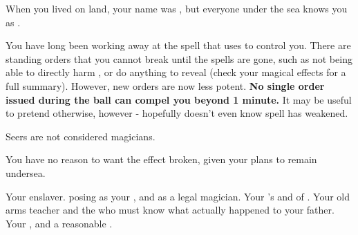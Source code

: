 \documentclass[char]{NeptuneBall}
\begin{document}
\begin{itemz}[Note]
  \item When you lived on land, your name was \cSlave{}, but everyone under the sea knows you as \cSlave{\full}.
	\item You have long been working away at the spell that \cWitch{} uses to control you. There are standing orders that you cannot break until the spells are gone, such as not being able to directly harm \cWitch{\them}, or do anything to reveal \cWitch{\them} (check your magical effects for a full summary). However, new orders are now less potent. {\bf No single order issued during the ball can compel you beyond 1 minute.} It may be useful to pretend otherwise, however - \cWitch{} hopefully doesn't even know \cWitch{\their} spell has weakened.
  \item Seers are not considered magicians.
  \item You have no reason to want the \iTransformed{} effect broken, given your plans to remain undersea.
\end{itemz}

\begin{contacts}
  \contact{\cWitch{}} Your enslaver. \cWitch{\They} \cWitch{\are} posing as your \cWitch{\sibling}, and as a legal magician.
  \contact{\cAriel{}} Your \cEric{\sibling}'s \cAriel{\spouse} and \cAriel{\King} of \pAmerica{}.
  \contact{\cGeneral{}} Your old arms teacher and the \cGeneral{\mer} who must know what actually happened to your father.
  \contact{\cKing{}} Your \cKing{\King}, and a reasonable \cKing{\mer}.
\end{contacts}
\end{document}
